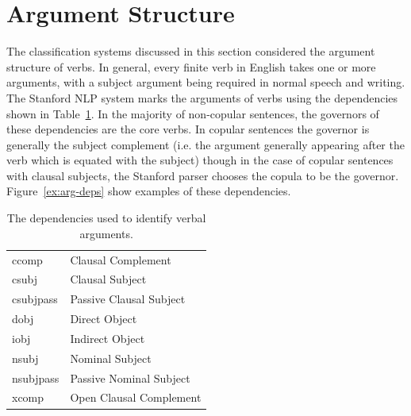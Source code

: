 \documentclass[main.tex]{subfiles}
\begin{document}
\section{Argument Structure}

The classification systems discussed in this section considered the argument structure of verbs. In general, every finite verb in English takes one or more arguments, with a subject argument being required in normal speech and writing. The Stanford NLP system marks the arguments of verbs using the dependencies shown in Table~\ref{table:arg-deps}. In the majority of non-copular sentences, the governors of these dependencies are the core verbs. In copular sentences the governor is generally the subject complement (i.e. the argument generally appearing after the verb which is equated with the subject) though in the case of copular sentences with clausal subjects, the Stanford parser chooses the copula to be the governor.
Figure~\ref{ex:arg-deps} show examples of these dependencies.

\begin{table}[ht]
\small
\centering
\caption{The dependencies used to identify verbal arguments.}
\begin{tabular}{ l l }
\toprule
ccomp & Clausal Complement\\
csubj & Clausal Subject\\
csubjpass & Passive Clausal Subject\\
dobj & Direct Object\\
iobj & Indirect Object \\
nsubj & Nominal Subject\\
nsubjpass & Passive Nominal Subject\\
xcomp & Open Clausal Complement\\

\bottomrule
\end{tabular}
\label{table:arg-deps}
\end{table}
\end{document}
